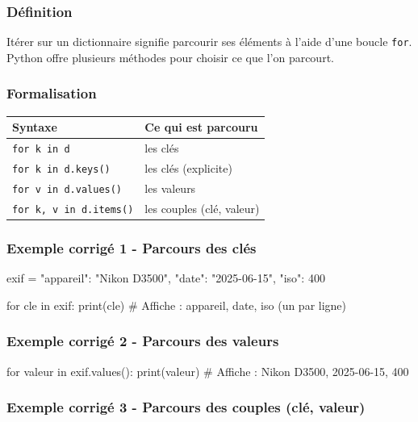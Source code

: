 \subsubsection{Définition}

Itérer sur un dictionnaire signifie parcourir ses éléments à l'aide
d'une boucle \texttt{for}. Python offre plusieurs méthodes pour choisir
ce que l'on parcourt.

\subsubsection{Formalisation}

\begin{longtable}[]{@{}ll@{}}
\toprule\noalign{}
Syntaxe & Ce qui est parcouru \\
\midrule\noalign{}
\endhead
\bottomrule\noalign{}
\endlastfoot
\texttt{for\ k\ in\ d} & les clés \\
\texttt{for\ k\ in\ d.keys()} & les clés (explicite) \\
\texttt{for\ v\ in\ d.values()} & les valeurs \\
\texttt{for\ k,\ v\ in\ d.items()} & les couples (clé, valeur) \\
\end{longtable}

\subsubsection{Exemple corrigé 1 - Parcours des clés}

\begin{python}
exif = {"appareil": "Nikon D3500", "date": "2025-06-15", "iso": 400}

for cle in exif:
    print(cle)
# Affiche : appareil, date, iso (un par ligne)
\end{python}

\subsubsection{Exemple corrigé 2 - Parcours des valeurs}

\begin{python}
for valeur in exif.values():
    print(valeur)
# Affiche : Nikon D3500, 2025-06-15, 400
\end{python}

\subsubsection{Exemple corrigé 3 - Parcours des couples (clé, valeur)}

